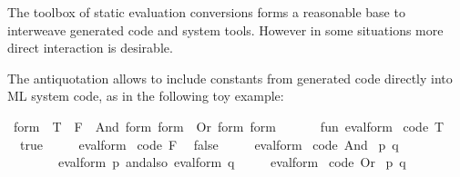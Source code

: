 \begin{isabellebody}
\begin{isamarkuptext}
\begin{tabular}{ll||c|c|c}
  \end{tabular}%
\end{isamarkuptext}%
\isamarkuptrue%
%
\isamarkuptrue%
%
\begin{isamarkuptext}%
The toolbox of static evaluation conversions forms a reasonable base
  to interweave generated code and system tools.  However in some
  situations more direct interaction is desirable.%
\end{isamarkuptext}%
\isamarkuptrue%
%
\isamarkuptrue%
%
\begin{isamarkuptext}%
The  antiquotation allows to include constants from
  generated code directly into ML system code, as in the following toy
  example:%
\end{isamarkuptext}%
\isamarkuptrue%
%
\isadelimquote
%
\endisadelimquote
%
\isatagquote
{}\isamarkupfalse%
\ form\ {}\ T\ {}\ F\ {}\ And\ form\ form\ {}\ Or\ form\ form\ %
\endisatagquote
{\isafoldquote}%
%
\isadelimquote
%
\endisadelimquote
%
\isadelimquotett
\ %
\endisadelimquotett
%
\isatagquotett
{}\isamarkupfalse%
\ {}\isanewline
\ \ fun\ eval{}form\ %
\isaantiq
code\ T{}%
\endisaantiq
\ {}\ true\isanewline
\ \ \ \ {}\ eval{}form\ %
\isaantiq
code\ F{}%
\endisaantiq
\ {}\ false\isanewline
\ \ \ \ {}\ eval{}form\ {}%
\isaantiq
code\ And{}%
\endisaantiq
\ {}p{}\ q{}{}\ {}\isanewline
\ \ \ \ \ \ \ \ eval{}form\ p\ andalso\ eval{}form\ q\isanewline
\ \ \ \ {}\ eval{}form\ {}%
\isaantiq
code\ Or{}%
\endisaantiq
\ {}p{}\ q{}{}\ {}\isanewline

\end{isabellebody}
